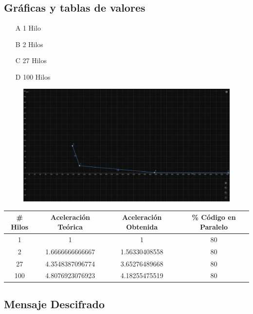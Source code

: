 \documentclass[10pt,letterpaper]{article}
\begin{document}
\subsection*{Gráficas y tablas de valores}  

\begin{itemize}
    \item[A] 1 Hilo

    \item[B] 2 Hilos

    \item[C] 27 Hilos

    \item[D] 100 Hilos
\end{itemize}

\begin{figure}[H]
    \centering
    \includegraphics[scale=0.29]{P02/IMG/00.png}
\end{figure}

\begin{center}
    \begin{tabular}{|c|c|c|c|}
         \hline
         \# Hilos & Aceleración Teórica & Aceleración Obtenida & \% Código en Paralelo\\
         \hline
         1 & 1 & 1 & 80\\
         \hline
         2 & 1.6666666666667 & 1.56330408558 & 80\\
         \hline
         27 & 4.3548387096774 & 3.65276489668 & 80\\
         \hline
         100 & 4.8076923076923 & 4.18255475519 & 80\\
         \hline
    \end{tabular}
\end{center}

\subsection*{Mensaje Descifrado}
\end{document}
